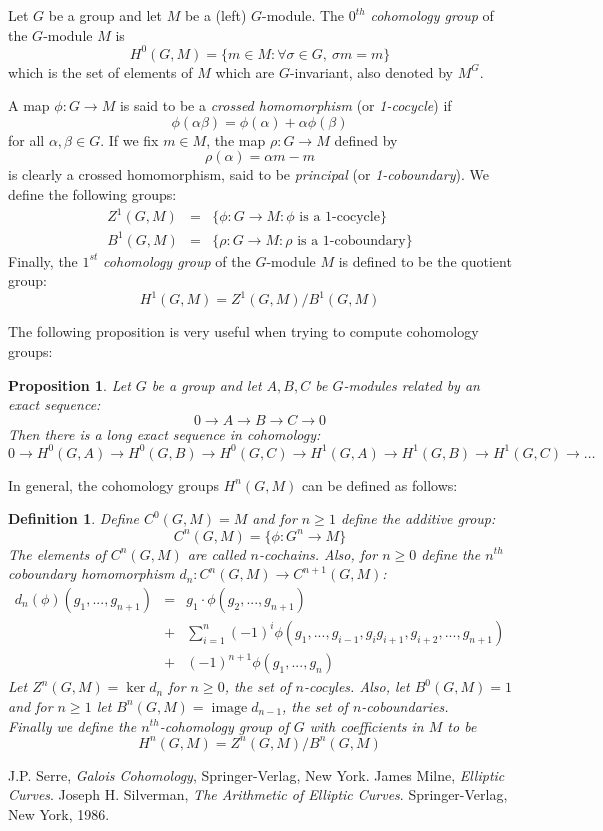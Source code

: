 \documentclass[12pt]{article}
\newtheorem{defn}{Definition}
\newtheorem{prop}{Proposition}
\begin{document}
Let $G$ be a group and let $M$ be a (left) $G$-module. The
$0^{th}$ \emph{cohomology group} of the $G$-module $M$ is
$$H^0(G,M)=\{m\in M: \forall \sigma \in G,\ \sigma m=m\}$$
which is the set of elements of $M$ which are $G$-invariant, also
denoted by $M^G$.

A map $\phi\colon G\to M$ is said to be a \emph{crossed
homomorphism} (or \emph{1-cocycle}) if
$$\phi(\alpha\beta)=\phi(\alpha)+\alpha\phi(\beta)$$
for all $\alpha,\beta \in G$. If we fix $m\in M$, the map
$\rho\colon G\to M$ defined by
$$\rho(\alpha)=\alpha m-m$$
is clearly a crossed homomorphism, said to be \emph{principal} (or
\emph{1-coboundary}). We define the following groups:
\begin{eqnarray}
\nonumber Z^1(G,M)&=&\{\phi: G\to M\colon \phi \text{ is a 1-cocycle}\}\\
\nonumber B^1(G,M)&=&\{\rho: G\to M\colon \rho \text{ is a
1-coboundary}\}
\end{eqnarray}
Finally, the $1^{st}$ \emph{cohomology group} of the $G$-module
$M$ is defined to be the quotient group:
$$H^1(G,M)=Z^1(G,M)/B^1(G,M)$$

The following proposition is very useful when trying to compute
cohomology groups:
\begin{prop}
Let $G$ be a group and let $A,B,C$ be $G$-modules related by an
exact sequence:
$$0\to A\to B\to C\to 0$$
Then there is a long exact sequence in cohomology:
$$0\to H^0(G,A)\to H^0(G,B)\to H^0(G,C)\to H^1(G,A)\to H^1(G,B)\to
H^1(G,C)\to \ldots$$
\end{prop}

In general, the cohomology groups $H^n(G,M)$ can be defined as
follows:

\begin{defn}
Define $C^0(G,M)=M$ and for $n\geq 1$ define the additive group:
$$C^n(G,M)=\{\phi\colon G^n \to M\}$$
The elements of $C^n(G,M)$ are called $n$-cochains. Also, for
$n\geq 0$ define the $n^{th}$ coboundary homomorphism $d_n\colon
C^n(G,M) \to C^{n+1}(G,M)$:
\begin{eqnarray}
\nonumber d_n(\phi)(g_1,...,g_{n+1})&=&g_1\cdot \phi(g_2,...,g_{n+1})\\
\nonumber &+&
\sum_{i=1}^n(-1)^i\phi(g_1,...,g_{i-1},g_ig_{i+1},g_{i+2},
...,g_{n+1})\\
\nonumber &+& (-1)^{n+1}\phi(g_1,...,g_n)
\end{eqnarray}
Let $Z^n(G,M)=\operatorname{ker} d_n$ for $n\geq 0$, the set of
$n$-cocyles. Also, let $B^0(G,M)=1$ and for $n\geq 1$ let
$B^n(G,M)=\operatorname{image}d_{n-1}$, the set of
$n$-coboundaries.\\

Finally we define the $n^{th}$-cohomology group of $G$ with
coefficients in $M$ to be $$H^n(G,M)=Z^n(G,M)/B^n(G,M)$$
\end{defn}

\begin{thebibliography}{9}
 J.P. Serre, {\em Galois Cohomology},
Springer-Verlag, New York.
 James Milne, {\em Elliptic Curves}.
 Joseph H. Silverman, {\em The Arithmetic of Elliptic Curves}. Springer-Verlag, New York, 1986.
\end{thebibliography}
\end{document}
